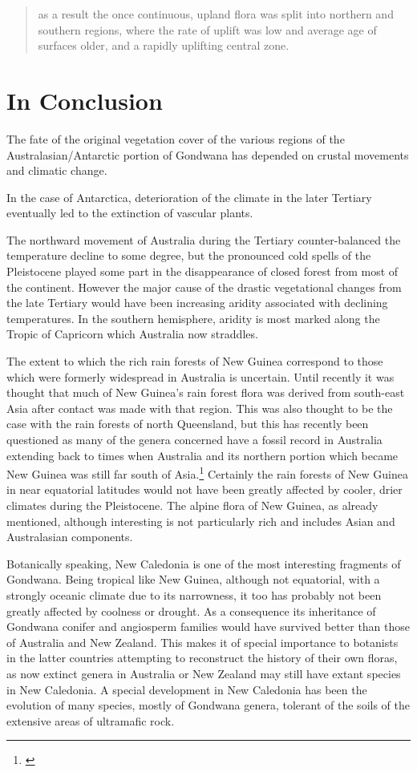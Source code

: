 \begin{quote}
	as a result the once continuous, upland flora was split into northern and southern regions, where the rate of uplift was low and average age of surfaces older, and a rapidly uplifting central zone.
\end{quote}

\section{In Conclusion}

The fate of the original vegetation cover of the various regions of the Australasian/Antarctic portion of Gondwana has depended on crustal movements and climatic change.

In the case of Antarctica, deterioration of the climate in the later Tertiary eventually led to the extinction of vascular plants.

The northward movement of Australia during the Tertiary counter-balanced the temperature decline to some degree, but the pronounced cold spells of the Pleistocene played some part in the disappearance of closed forest from most of the continent.
However the major cause of the drastic vegetational changes from the late Tertiary would have been increasing aridity associated with declining temperatures.
In the southern hemisphere, aridity is most marked along the Tropic of Capricorn which Australia now straddles.

The extent to which the rich rain forests of New Guinea correspond to those which were formerly widespread in Australia is uncertain.
Until recently it was thought that much of New Guinea's rain forest flora was derived from south-east Asia after contact was made with that region.
This was also thought to be the case with the rain forests of north Queensland, but this has recently been questioned as many of the genera concerned have a fossil record in Australia extending back to times when Australia and its northern portion which became New Guinea was still far south of Asia.\footnote{\cite{webb1986recent}}
Certainly the rain forests of New Guinea in near equatorial latitudes would not have been greatly affected by cooler, drier climates during the Pleistocene.
The alpine flora of New Guinea, as already mentioned, although interesting is not particularly rich and includes Asian and Australasian components.

Botanically speaking, New Caledonia is one of the most interesting fragments of Gondwana.
Being tropical like New Guinea, although not equatorial, with a strongly oceanic climate due to its narrowness, it too has probably not been greatly affected by coolness or drought.
As a consequence its inheritance of Gondwana conifer and angiosperm families would have survived better than those of Australia and New Zealand.
This makes it of special importance to botanists in the latter countries attempting to reconstruct the history of their own floras, as now extinct genera in Australia or New Zealand may still have extant species in New Caledonia.
A special development in New Caledonia has been the evolution of many species, mostly of Gondwana genera, tolerant of the soils of the extensive areas of ultramafic rock.

